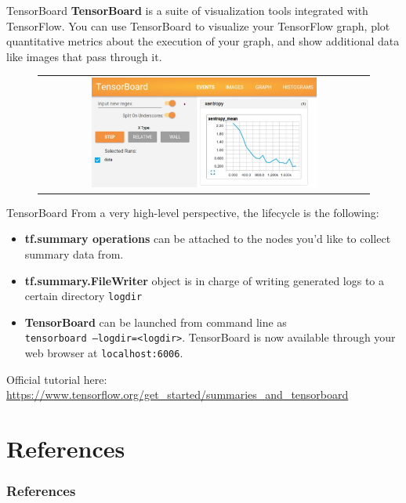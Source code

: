 \documentclass[aspectratio=169]{beamer}
\begin{document}
\begin{frame}{TensorBoard}
\textbf{TensorBoard} is a suite of visualization tools integrated with TensorFlow. You can use TensorBoard to visualize your TensorFlow graph, plot quantitative metrics about the execution of your graph, and show additional data like images that pass through it.
\begin{figure}
\begin{tabular}{c}
\includegraphics[width=0.7\textwidth]{img/tf/tensorboard.jpg}
\end{tabular}
\end{figure}
\end{frame}


\begin{frame}{TensorBoard}
From a very high-level perspective, the lifecycle is the following:
\begin{itemize}
\item \textbf{tf.summary operations} can be attached to the nodes you'd like to collect summary data from.
\item \textbf{tf.summary.FileWriter} object is in charge of writing generated logs to a certain directory \texttt{logdir}
\item \textbf{TensorBoard} can be launched from command line as\\
\texttt{tensorboard --logdir=<logdir>}. TensorBoard is now available through your web browser at \texttt{localhost:6006}.
\end{itemize}
Official tutorial here: \url{https://www.tensorflow.org/get_started/summaries_and_tensorboard}
\end{frame}


\section{References}

\begin{frame}[t, allowframebreaks]
\frametitle{References}


\end{frame}
\end{document}
